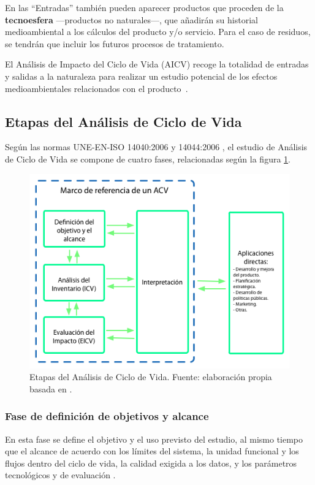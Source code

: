 En las ``Entradas'' también pueden aparecer productos que proceden de la \textbf{tecnoesfera} —productos no naturales—, que añadirán su historial medioambiental a los cálculos del producto y/o servicio. Para el caso de residuos, se tendrán que incluir los futuros procesos de tratamiento.

El Análisis de Impacto del Ciclo de Vida (AICV) recoge la totalidad de entradas y salidas a la naturaleza para realizar un estudio potencial de los efectos medioambientales relacionados con el producto \cite{iso14040}.

\subsection{Etapas del Análisis de Ciclo de Vida}\label{sec:etapaslca}

Según las normas UNE-EN-ISO 14040:2006 y 14044:2006 \cite{iso14040,iso14044}, el estudio de Análisis de Ciclo de Vida se compone de cuatro fases, relacionadas según la figura \ref{fig:etapaslca}.

\begin{figure}[!htb]
\centering
\includegraphics[width=12cm]{img/etapas_lca.png}
\caption[Etapas del Análisis de Ciclo de Vida.]{Etapas del Análisis de Ciclo de Vida. Fuente: elaboración propia basada en \protect\cite{iso14040}.}
\label{fig:etapaslca}
\end{figure}

\subsubsection{Fase de definición de objetivos y alcance}
En esta fase se define el objetivo y el uso previsto del estudio, al mismo tiempo que el alcance de acuerdo con los límites del sistema, la unidad funcional y los flujos dentro del ciclo de vida, la calidad exigida a los datos, y los parámetros tecnológicos y de evaluación \cite{iso14040,ihobeeco}.

